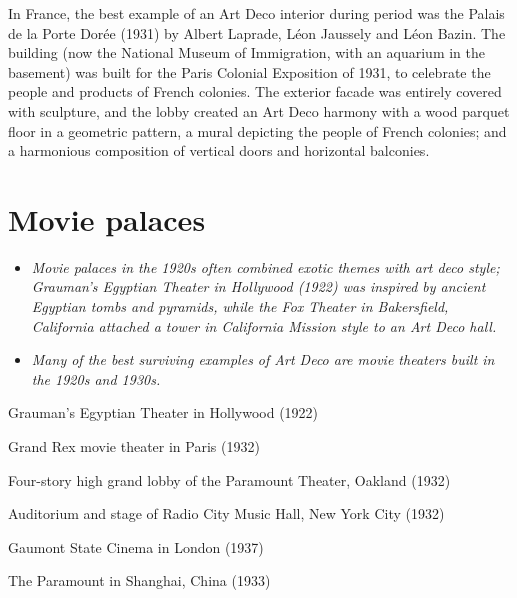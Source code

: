 In France, the best example of an Art Deco interior during period was
the Palais de la Porte Dorée (1931) by Albert Laprade, Léon Jaussely and
Léon Bazin. The building (now the National Museum of Immigration, with
an aquarium in the basement) was built for the Paris Colonial Exposition
of 1931, to celebrate the people and products of French colonies. The
exterior facade was entirely covered with sculpture, and the lobby
created an Art Deco harmony with a wood parquet floor in a geometric
pattern, a mural depicting the people of French colonies; and a
harmonious composition of vertical doors and horizontal balconies.

\section{Movie palaces}\label{movie-palaces}

\begin{itemize}
\item
  \emph{Movie palaces in the 1920s often combined exotic themes with art
  deco style; Grauman's Egyptian Theater in Hollywood (1922) was
  inspired by ancient Egyptian tombs and pyramids, while the Fox Theater
  in Bakersfield, California attached a tower in California Mission
  style to an Art Deco hall.}
\item
  \emph{Many of the best surviving examples of Art Deco are movie
  theaters built in the 1920s and 1930s.}
\end{itemize}

Grauman's Egyptian Theater in Hollywood (1922)

Grand Rex movie theater in Paris (1932)

Four-story high grand lobby of the Paramount Theater, Oakland (1932)

Auditorium and stage of Radio City Music Hall, New York City (1932)

Gaumont State Cinema in London (1937)

The Paramount in Shanghai, China (1933)

